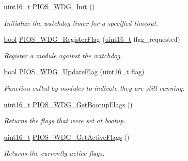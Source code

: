 \begin{DoxyCompactItemize}
\item 
\hyperlink{stdint_8h_a273cf69d639a59973b6019625df33e30}{uint16\-\_\-t} \hyperlink{group___p_i_o_s___w_d_g_ga99a1be2d1652eb3a9889be228a618286}{P\-I\-O\-S\-\_\-\-W\-D\-G\-\_\-\-Init} ()
\begin{DoxyCompactList}\small\item\em Initialize the watchdog timer for a specified timeout. \end{DoxyCompactList}\item 
\hyperlink{group___exported__types_gaf6a258d8f3ee5206d682d799316314b1}{bool} \hyperlink{group___p_i_o_s___w_d_g_ga181128f13ffdec27ea07e13fc4a4e1ab}{P\-I\-O\-S\-\_\-\-W\-D\-G\-\_\-\-Register\-Flag} (\hyperlink{stdint_8h_a273cf69d639a59973b6019625df33e30}{uint16\-\_\-t} flag\-\_\-requested)
\begin{DoxyCompactList}\small\item\em Register a module against the watchdog. \end{DoxyCompactList}\item 
\hyperlink{group___exported__types_gaf6a258d8f3ee5206d682d799316314b1}{bool} \hyperlink{group___p_i_o_s___w_d_g_ga4698d93015624e320b5c7c980c4edecd}{P\-I\-O\-S\-\_\-\-W\-D\-G\-\_\-\-Update\-Flag} (\hyperlink{stdint_8h_a273cf69d639a59973b6019625df33e30}{uint16\-\_\-t} flag)
\begin{DoxyCompactList}\small\item\em Function called by modules to indicate they are still running. \end{DoxyCompactList}\item 
\hyperlink{stdint_8h_a273cf69d639a59973b6019625df33e30}{uint16\-\_\-t} \hyperlink{group___p_i_o_s___w_d_g_ga0cb157cf1f3763126ab097d9bf67658b}{P\-I\-O\-S\-\_\-\-W\-D\-G\-\_\-\-Get\-Bootup\-Flags} ()
\begin{DoxyCompactList}\small\item\em Returns the flags that were set at bootup. \end{DoxyCompactList}\item 
\hyperlink{stdint_8h_a273cf69d639a59973b6019625df33e30}{uint16\-\_\-t} \hyperlink{group___p_i_o_s___w_d_g_ga725a2e6282c5cb3c63d5c022204aec22}{P\-I\-O\-S\-\_\-\-W\-D\-G\-\_\-\-Get\-Active\-Flags} ()
\begin{DoxyCompactList}\small\item\em Returns the currently active flags. \end{DoxyCompactList}\item 

\end{DoxyCompactItemize}
